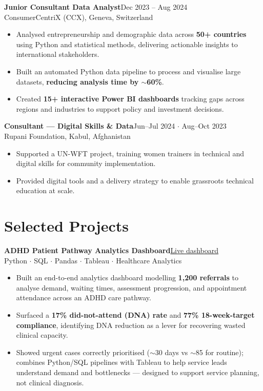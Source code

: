 \documentclass[a4paper,10pt]{article}
\newcommand{\entry}[4]{%
  \noindent\textbf{#1}\hfill{\color{muted}\small #2}\\[-0.2em]
  {\color{accent}\small #3}\\[0.1em]
  #4
}
\begin{document}
\entry{Junior Consultant Data Analyst}
      {Dec 2023 -- Aug 2024}
      {ConsumerCentriX (CCX), Geneva, Switzerland}
      {\begin{itemize}
        \item Analysed entrepreneurship and demographic data across \textbf{50+ countries}
              using Python and statistical methods, delivering actionable insights to
              international stakeholders.
        \item Built an automated Python data pipeline to process and visualise large datasets,
              \textbf{reducing analysis time by $\sim$60\%}.
        \item Created \textbf{15+ interactive Power BI dashboards} tracking gaps across regions
              and industries to support policy and investment decisions.
      \end{itemize}}
\vspace{0.5em}

\entry{Consultant --- Digital Skills \& Data}
      {Jun--Jul 2024 $\cdot$ Aug--Oct 2023}
      {Rupani Foundation, Kabul, Afghanistan}
      {\begin{itemize}
        \item Supported a UN-WFT project, training women trainers in technical and digital
              skills for community implementation.
        \item Provided digital tools and a delivery strategy to enable grassroots technical
              education at scale.
      \end{itemize}}

\section*{Selected Projects}

\entry{ADHD Patient Pathway Analytics Dashboard}
      {\href{https://public.tableau.com/views/MonthlyReferralADHDanalysis/Dashboard1}{Live dashboard}}
      {Python $\cdot$ SQL $\cdot$ Pandas $\cdot$ Tableau $\cdot$ Healthcare Analytics}
      {\begin{itemize}
        \item Built an end-to-end analytics dashboard modelling \textbf{1,200 referrals} to
              analyse demand, waiting times, assessment progression, and appointment attendance
              across an ADHD care pathway.
        \item Surfaced a \textbf{17\% did-not-attend (DNA) rate} and \textbf{77\%
              18-week-target compliance}, identifying DNA reduction as a lever for recovering
              wasted clinical capacity.
        \item Showed urgent cases correctly prioritised ($\sim$30 days vs $\sim$85 for routine);
              combines Python/SQL pipelines with Tableau to help service leads understand demand
              and bottlenecks --- designed to support service planning, not clinical diagnosis.
      \end{itemize}}
\vspace{0.5em}
\end{document}
